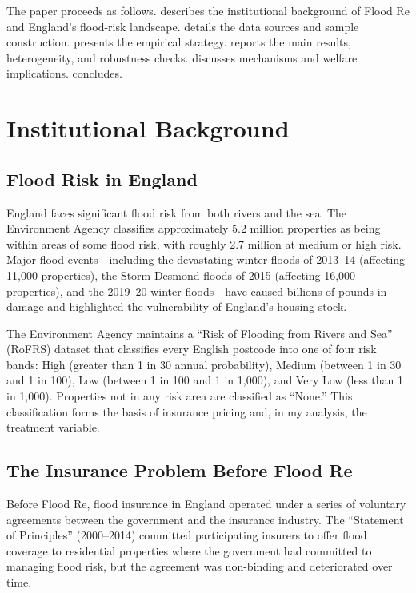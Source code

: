 \documentclass[12pt]{article}
\begin{document}
The paper proceeds as follows.  describes the institutional background of Flood Re and England's flood-risk landscape.  details the data sources and sample construction.  presents the empirical strategy.  reports the main results, heterogeneity, and robustness checks.  discusses mechanisms and welfare implications.  concludes.


\section{Institutional Background} \label{sec:background}

\subsection{Flood Risk in England}

England faces significant flood risk from both rivers and the sea. The Environment Agency classifies approximately 5.2 million properties as being within areas of some flood risk, with roughly 2.7 million at medium or high risk. Major flood events---including the devastating winter floods of 2013--14 (affecting 11,000 properties), the Storm Desmond floods of 2015 (affecting 16,000 properties), and the 2019--20 winter floods---have caused billions of pounds in damage and highlighted the vulnerability of England's housing stock.

The Environment Agency maintains a ``Risk of Flooding from Rivers and Sea'' (RoFRS) dataset that classifies every English postcode into one of four risk bands: High (greater than 1 in 30 annual probability), Medium (between 1 in 30 and 1 in 100), Low (between 1 in 100 and 1 in 1,000), and Very Low (less than 1 in 1,000). Properties not in any risk area are classified as ``None.'' This classification forms the basis of insurance pricing and, in my analysis, the treatment variable.

\subsection{The Insurance Problem Before Flood Re}

Before Flood Re, flood insurance in England operated under a series of voluntary agreements between the government and the insurance industry. The ``Statement of Principles'' (2000--2014) committed participating insurers to offer flood coverage to residential properties where the government had committed to managing flood risk, but the agreement was non-binding and deteriorated over time.
\end{document}
